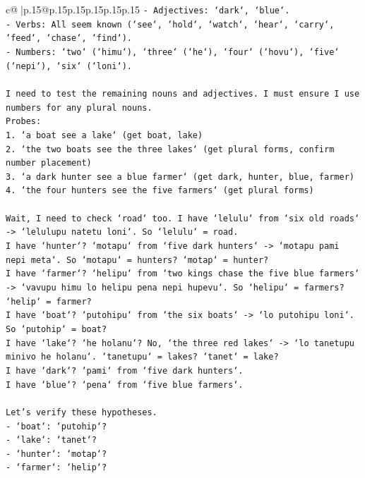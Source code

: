 \documentclass{article}
\begin{document}
{\begin{supertabular}{c@{$\;$}|p{.15\linewidth}@{}p{.15\linewidth}p{.15\linewidth}p{.15\linewidth}p{.15\linewidth}p{.15\linewidth}}
{{{\texttt{{-} Adjectives: `dark`, `blue`.} \\
\texttt{{-} Verbs: All seem known (`see`, `hold`, `watch`, `hear`, `carry`, `feed`, `chase`, `find`).} \\
\texttt{{-} Numbers: `two` (`himu`), `three` (`he`), `four` (`hovu`), `five` (`nepi`), `six` (`loni`).} \\
\\ 
\texttt{I need to test the remaining nouns and adjectives. I must ensure I use numbers for any plural nouns.} \\
\texttt{Probes:} \\
\texttt{1. `a boat see a lake` (get boat, lake)} \\
\texttt{2. `the two boats see the three lakes` (get plural forms, confirm number placement)} \\
\texttt{3. `a dark hunter see a blue farmer` (get dark, hunter, blue, farmer)} \\
\texttt{4. `the four hunters see the five farmers` (get plural forms)} \\
\\ 
\texttt{Wait, I need to check `road` too. I have `lelulu` from `six old roads` {-}> `lelulupu natetu loni`. So `lelulu` = road.} \\
\texttt{I have `hunter`? `motapu` from `five dark hunters` {-}> `motapu pami nepi meta`. So `motapu` = hunters? `motap` = hunter?} \\
\texttt{I have `farmer`? `helipu` from `two kings chase the five blue farmers` {-}> `vavupu himu lo helipu pena nepi hupevu`. So `helipu` = farmers? `helip` = farmer?} \\
\texttt{I have `boat`? `putohipu` from `the six boats` {-}> `lo putohipu loni`. So `putohip` = boat?} \\
\texttt{I have `lake`? `he holanu`? No, `the three red lakes` {-}> `lo tanetupu minivo he holanu`. `tanetupu` = lakes? `tanet` = lake?} \\
\texttt{I have `dark`? `pami` from `five dark hunters`.} \\
\texttt{I have `blue`? `pena` from `five blue farmers`.} \\
\\ 
\texttt{Let's verify these hypotheses.} \\
\texttt{{-} `boat`: `putohip`?} \\
\texttt{{-} `lake`: `tanet`?} \\
\texttt{{-} `hunter`: `motap`?} \\
\texttt{{-} `farmer`: `helip`?} \\
}}}
\end{supertabular}}
\end{document}
